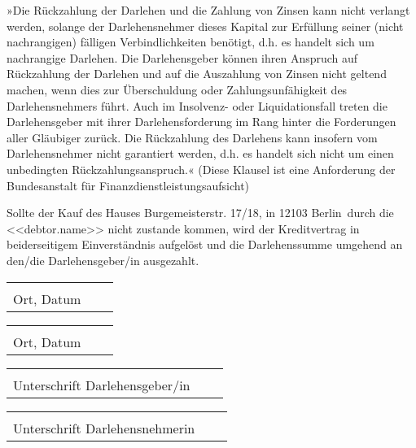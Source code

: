 \documentclass[]{scrartcl}
\newcommand{\addressStreet}{Burgemeisterstr. 17/18}
\newcommand{\addressWithZIP}{\addressStreet, in 12103 Berlin}
\begin{document}
\begin{contract}
»Die Rückzahlung der Darlehen und die Zahlung von Zinsen kann nicht verlangt werden, solange der Darlehensnehmer dieses Kapital zur Erfüllung seiner (nicht nachrangigen) fälligen Verbindlichkeiten benötigt, d.h. es handelt sich um nachrangige Darlehen. Die Darlehensgeber können ihren Anspruch auf Rückzahlung der Darlehen und auf die Auszahlung von Zinsen nicht geltend machen, wenn dies zur Überschuldung oder Zahlungsunfähigkeit des Darlehensnehmers führt. Auch im Insolvenz- oder Liquidationsfall treten die Darlehensgeber mit ihrer Darlehensforderung im Rang hinter die Forderungen aller Gläubiger zurück. Die Rückzahlung des Darlehens kann insofern vom Darlehensnehmer nicht garantiert werden, d.h. es handelt sich nicht um einen unbedingten Rückzahlungsanspruch.« (Diese Klausel ist eine Anforderung der Bundesanstalt für Finanzdienstleistungsaufsicht)

Sollte der Kauf des Hauses \addressWithZIP\ durch die <<debtor.name>> nicht zustande kommen, wird der Kreditvertrag in beiderseitigem Einverständnis aufgelöst und die Darlehenssumme umgehend an den/die Darlehensgeber/in ausgezahlt.

\end{contract}

\vspace{1,5 cm}
\begin{tabular}{p{7cm}p{.5cm}l}
\dotfill \\
Ort, Datum
\end{tabular}%
\hfill
\begin{tabular}{p{7cm}p{.5cm}l}
\dotfill \\
Ort, Datum
\end{tabular}%

\vspace{1,5 cm}
\begin{tabular}{p{7cm}p{.5cm}l}
\dotfill \\
Unterschrift Darlehensgeber/in
\end{tabular}%
\hfill
\begin{tabular}{p{7cm}p{.5cm}l}
\dotfill \\
Unterschrift Darlehensnehmerin
\end{tabular}%
\end{document}
